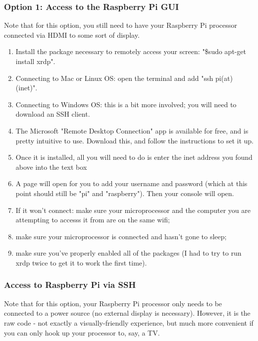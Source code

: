 \documentclass{article}\usepackage[]{graphicx}\usepackage[]{color}
\begin{document}
\subsubsection{Option 1: Access to the Raspberry Pi GUI}

Note that for this option, you still need to have your Raspberry Pi processor connected via HDMI to some sort of display.

\begin{enumerate}

\item Install the package necessary to remotely access your screen: "\$sudo apt-get install xrdp".
\item Connecting to Mac or Linux OS: open the terminal and add "ssh pi(at) (inet)".
\item Connecting to Windows OS: this is a bit more involved; you will need to download an SSH client.  
\item The Microsoft "Remote Desktop Connection" app is available for free, and is pretty intuitive to use.  Download this, and follow the instructions to set it up.  
\item Once it is installed, all you will need to do is enter the inet address you found above into the text box
\item A page will open for you to add your username and password (which at this point should still be "pi" and "raspberry").  Then your console will open.
\item If it won't connect: make sure your microprocessor and the computer you are attempting to accesss it from are on the same wifi;
\item make sure your microprocessor is connected and hasn't gone to sleep; 
\item make sure you've properly enabled all of the packages (I had to try to run xrdp twice to get it to work the first time).  

\end{enumerate}

\subsubsection{Access to Raspberry Pi via SSH}

Note that for this option, your Raspberry Pi processor only needs to be connected to a power source (no external display is necessary).  However, it is the raw code - not exactly a visually-friendly experience, but much more convenient if you can only hook up your processor to, say, a TV.
\end{document}
